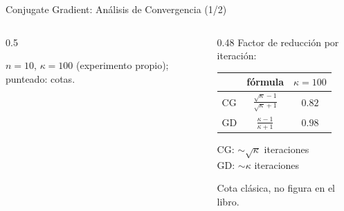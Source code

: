 \begin{frame}{Conjugate Gradient: Análisis de Convergencia (1/2)}
\begin{columns}[T]
\begin{column}{0.5\textwidth}
            {\tiny $n=10$, $\kappa=100$ (experimento propio); punteado: cotas.\par}
        \end{column}
        \begin{column}{0.48\textwidth}
            \small
            Factor de reducción por iteración:
            \vspace{0.4em}

            \centering
            \begin{tabular}{l c c}
                \toprule
                & fórmula & $\kappa=100$ \\
                \midrule
                CG & $\frac{\sqrt{\kappa}-1}{\sqrt{\kappa}+1}$ & $0.82$ \\[3pt]
                GD & $\frac{\kappa-1}{\kappa+1}$ & $0.98$ \\
                \bottomrule
            \end{tabular}

            \vspace{0.6em}
            \raggedright
            CG: $\sim\!\sqrt{\kappa}$ iteraciones \\
            GD: $\sim\!\kappa$ iteraciones

            \vspace{0.3em}
            {\tiny Cota clásica, no figura en el libro.\par}
        \end{column}
    \end{columns}
\end{frame}

